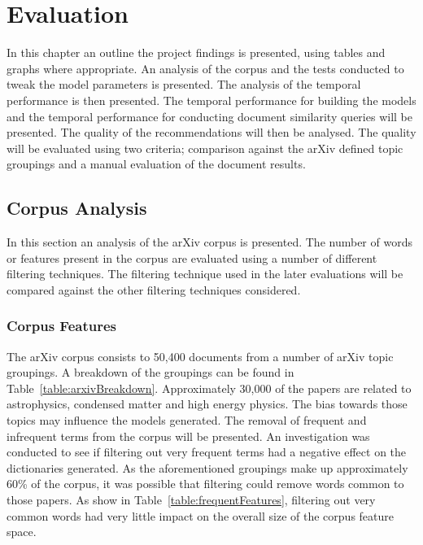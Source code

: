 \chapter{Evaluation}
In this chapter an outline the project findings is presented, using tables and graphs where appropriate.
An analysis of the corpus and the tests conducted to tweak the model parameters is presented.
The analysis of the temporal performance is then presented.
The temporal performance for building the models and the temporal performance for conducting document similarity queries will be presented.
The quality of the recommendations will then be analysed.
The quality will be evaluated using two criteria; comparison against the arXiv defined topic groupings and a manual evaluation of the document results.

\section{Corpus Analysis}
In this section an analysis of the arXiv corpus is presented.
The number of words or features present in the corpus are evaluated using a number of different filtering techniques.
The filtering technique used in the later evaluations will be compared against the other filtering techniques considered.

\subsection{Corpus Features}
The arXiv corpus consists to 50,400 documents from a number of arXiv topic groupings.
A breakdown of the groupings can be found in Table~\ref{table:arxivBreakdown}.
Approximately 30,000 of the papers are related to astrophysics, condensed matter and high energy physics.
The bias towards those topics may influence the models generated.
The removal of frequent and infrequent terms from the corpus will be presented.
An investigation was conducted to see if filtering out very frequent terms had a negative effect on the dictionaries generated.
As the aforementioned groupings make up approximately 60\% of the corpus, it was possible that filtering could remove words common to those papers.
As show in Table~\ref{table:frequentFeatures}, filtering out very common words had very little impact on the overall size of the corpus feature space.


